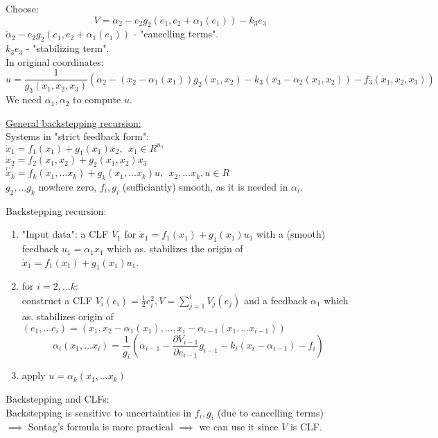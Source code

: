 Choose:
$$V = \dot \alpha_2 - e_2g_2(e_1,e_2+\alpha_1(e_1))-k_3e_3$$
$\dot \alpha_2 - e_2g_2(e_1,e_2+\alpha_1(e_1))$ - "cancelling terms".\\
$k_3e_3$ - "stabilizing term".\\

In original coordinates:\\
$$u=\frac{1}{g_3(x_1,x_2,x_3)}(\dot \alpha_2 - (x_2- \alpha_1(x_1))g_2(x_1,x_2)-k_3(x_3- \alpha_2(x_1,x_2))-f_3(x_1,x_2,x_3))$$
We need $\alpha_1, \alpha_2$ to compute $u$.

\underline{General backstepping recursion:}\\
Systems in "strict feedback form":\\
$\dot x_1 = f_1(x_1)+g_1(x_1)x_2, \ \ x_1 \in R^{n_1}$\\
$\dot x_2 = f_2(x_1,x_2)+g_2(x_1,x_2)x_3$\\
$\dots$\\
$\dot x_k = f_k(x_1,\dots x_k)+g_k(x_1,\dots x_k)u, \ \ x_2, \dots x_k, u \in R$\\
$g_2, \dots g_k$ nowhere zero, $f_i,g_i$ (sufficiantly) smooth, as it is needed in $\alpha_i$.


Backstepping recursion:
\begin{enumerate}
    \item "Input data": a CLF $V_1$ for $\dot x_1 = f_1(x_1)+g_1(x_1)u_1$ with a (smooth) feedback $u_1=\alpha_1x_1$ which as. stabilizes the origin of $\dot x_1 = f_1(x_1)+g_1(x_1)u_1$.
    \item for $i=2, \dots k$:\\
    construct a CLF $V_i(e_i)=\frac{1}{2}e_i^2, V = \sum \limits_{j=1}^iV_j(e_j)$ and a feedback $\alpha_1$ which as. stabilizes origin of $(e_1, \dots e_i) = (x_1,x_2-\alpha_1(x_1), \dots, x_i - \alpha_{i-1}(x_1, \dots x_{i-1}))$
    $$\alpha_i(x_1, \dots x_i) = \frac{1}{g_i}(\dot \alpha_{i-1} - \frac{\partial V_{i-1}}{\partial e_{i-1}}g_{i-1}-k_i(x_i-\alpha_{i-1})-f_i)$$
    \item apply $u=\alpha_k(x_1, \dots x_k)$
\end{enumerate}

Backstepping and CLFs:\\
Backstepping is sensitive to uncertainties in $f_i,g_i$ (due to cancelling terms)\\
$\implies$  Sontag's formula is more practical $\implies$ we can use it since $V$ is CLF. \\


